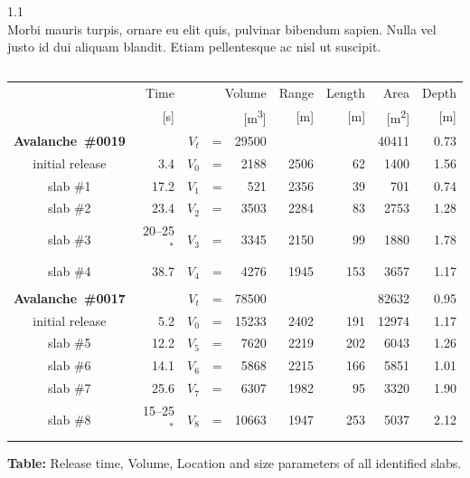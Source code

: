 \documentclass{article}
\begin{document}
\begin{frame}\label{slabtable}
\begin{columns}
\begin{column}[t]{1.1\textwidth}
\hyperlink{slab}{}\\
Morbi mauris turpis, ornare eu elit quis, pulvinar bibendum sapien. Nulla vel justo id dui aliquam blandit. Etiam pellentesque ac nisl ut suscipit. 



\vspace{0.3cm}
\end{column}
\end{columns}
 \begin{tabular}{c|rr@{}c@{}rrrrr}
 \setlength{\tabcolsep}{6mm}
   & Time & \multicolumn{3}{r}{Volume} & Range & Length & Area & Depth \\
   & [\si{\second}] & \multicolumn{3}{r}{[\si{\cubic\metre}]} & [\si{\metre}] &
[\si{\metre}] & [\si{\square\metre}] & [\si{\metre}]\\\hline

   \textbf{Avalanche~\#0019} & & $V_t$ &=& 29500 & & & 40411 & 0.73 \\
   initial release &3.4& $V_0$ &=& 2188 & 2506 &  62 &  1400 & 1.56 \\
   slab \#1 & 17.2    &  $V_1$ &=&  521 & 2356 &  39 &   701 & 0.74 \\
   slab \#2 & 23.4    &  $V_2$ &=& 3503 & 2284 &  83 &  2753 & 1.28 \\
   slab \#3 & 20--25$^*$ &  $V_3$ &=& 3345 & 2150 &  99 &  1880 & 1.78 \\
   slab \#4 & 38.7    &  $V_4$ &=& 4276 & 1945 & 153 &  3657 & 1.17 \\
   \\
   \textbf{Avalanche~\#0017} & &  $V_t$ &=& 78500 & & & 82632 & 0.95\\
   initial release&5.2&  $V_0$ &=& 15233 & 2402 & 191 & 12974 & 1.17\\
   slab \#5 & 12.2    &  $V_5$ &=&  7620 & 2219 & 202 &  6043 & 1.26 \\
   slab \#6 & 14.1    &  $V_6$ &=&  5868 & 2215 & 166 &  5851 & 1.01 \\
   slab \#7 & 25.6    &  $V_7$ &=&  6307 & 1982 &  95 &  3320 & 1.90 \\
   slab \#8 & 15--25$^*$ &  $V_8$ &=& 10663 & 1947 & 253 &  5037 & 2.12
 \end{tabular}
 
\vspace{0.2cm}
 \textbf{Table:} Release time, Volume, Location and size parameters of all
identified slabs.

\end{frame}
\end{document}
